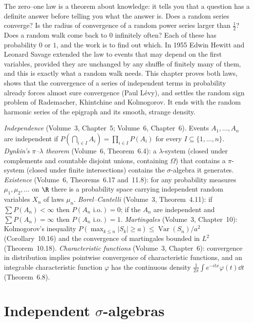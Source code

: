 The zero--one law is a theorem about knowledge: it tells you that a question has a definite answer before telling you
what the answer is. Does a random series converge? Is the radius of convergence of a random power series larger than
$\frac12$? Does a random walk come back to $0$ infinitely often? Each of these has probability $0$ or $1$, and the work
is to find out which. In 1955 Edwin Hewitt and Leonard Savage extended the law to events that may depend on the first
variables, provided they are unchanged by any shuffle of finitely many of them, and this is exactly what a random walk
needs. This chapter proves both laws, shows that the convergence of a series of independent terms in probability already
forces almost sure convergence (Paul L\'evy), and settles the random sign problem of Rademacher, Khintchine and
Kolmogorov. It ends with the random harmonic series of the epigraph and its smooth, strange density.

\begin{reminder}
\emph{Independence} (Volume~3, Chapter~5; Volume~6, Chapter~6). Events $A_1,\dots,A_n$ are independent if
$P(\bigcap_{i\in I}A_i)=\prod_{i\in I}P(A_i)$ for every $I\subseteq\{1,\dots,n\}$. \emph{Dynkin's $\pi$--$\lambda$
theorem} (Volume~6, Theorem~6.4): a $\lambda$-system (closed under complements and countable disjoint unions, containing
$\Omega$) that contains a $\pi$-system (closed under finite intersections) contains the $\sigma$-algebra it generates.
\emph{Existence} (Volume~6, Theorems~6.17 and~11.8): for any probability measures $\mu_1,\mu_2,\dots$ on $\R$ there is a
probability space carrying independent random variables $X_n$ of laws $\mu_n$. \emph{Borel--Cantelli} (Volume~3,
Theorem~4.11): if $\sum P(A_n)<\infty$ then $P(A_n\text{ i.o.})=0$; if the $A_n$ are independent and $\sum P(A_n)=\infty$
then $P(A_n\text{ i.o.})=1$. \emph{Martingales} (Volume~3, Chapter~10): Kolmogorov's inequality $P(\max_{k\le n}|S_k|\ge
a)\le\operatorname{Var}(S_n)/a^2$ (Corollary~10.16) and the convergence of martingales bounded in $L^2$ (Theorem~10.18).
\emph{Characteristic functions} (Volume~3, Chapter~6): convergence in distribution implies pointwise convergence of
characteristic functions, and an integrable characteristic function $\varphi$ has the continuous density
$\frac1{2\pi}\int e^{-itx}\varphi(t)\dd t$ (Theorem~6.8).
\end{reminder}

\section{Independent $\sigma$-algebras}

